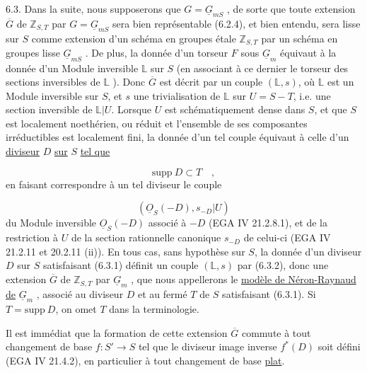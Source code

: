 6.3.  Dans la suite, nous supposerons que $G = \underline{G}_{mS}$ , de sorte que toute extension $\overline{G}$ de $\mathbb{Z}_{S,T}$ par $G = \underline{G}_{mS}$ sera bien représentable (6.2.4), et bien entendu, sera lisse sur $S$ comme extension d'un schéma en groupes étale $\mathbb{Z}_{S,T}$ par un schéma en groupes lisse $\underline{G}_{mS}$ . De plus, la donnée d'un torseur $F$ sous $\underline{G}_m$ équivaut à la donnée d'un Module inversible $\mathbb{L}$ sur $S$ (en associant à ce dernier le torseur des sections inversibles de $\mathbb{L}$ ). Donc $\overline{G}$ est décrit par un couple $(\mathbb{L},s)$, où $\mathbb{L}$ est un Module inversible sur $S$, et $s$ une trivialisation de $\mathbb{L}$ sur $U=S-T$, i.e. une section inversible de $\mathbb{L}|U$. Lorsque $U$ est schématiquement dense dans $S$, et que $S$ est localement noethérien, ou réduit et l'ensemble de ses composantes irréductibles est localement fini, la donnée d'un tel couple équivaut à celle d'un \underline{diviseur} $D$ \underline{sur} $S$ \underline{tel que}

\begin{equation}\tag{6.3.1}
\mathrm{supp}\ D \subset T \quad ,
\end{equation}
en faisant correspondre à un tel diviseur le couple

\begin{equation}\tag{6.3.2}
(\underline{O}_S(-D),s_{-D}|U)
\end{equation}
du Module inversible $\underline{O}_S(-D)$ associé à $-D$ (EGA IV 21.2.8.1), et de la restriction à $U$ de la section rationnelle canonique $s_{-D}$ de celui-ci (EGA IV 21.2.11 et 20.2.11 (ii)). En tous cas, sans hypothèse sur $S$, la donnée d'un diviseur $D$ sur $S$ satisfaisant (6.3.1) définit un couple $(\mathbb{L},s)$ par (6.3.2), donc une extension $\overline{G}$ de $\mathbb{Z}_{S,T}$ par $\underline{G}_m$ , que nous appellerons le \underline{modèle de Néron-Raynaud de} $\underline{G}_m$ , associé au diviseur $D$ et au fermé $T$ de $S$ satisfaisant (6.3.1). Si $T = \mathrm{supp}\ D$, on omet $T$ dans la terminologie.



Il est immédiat que la formation de cette extension $\overline{G}$ commute à tout changement de base $f : S' \longrightarrow S$ tel que le diviseur image inverse $f^*(D)$ soit défini (EGA IV 21.4.2), en particulier à tout changement de base \underline{plat}.

